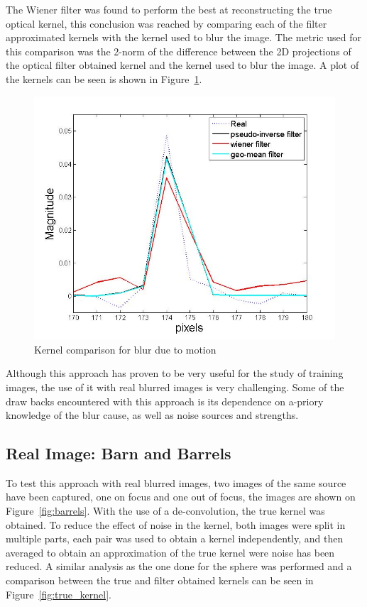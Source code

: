 The Wiener filter was found to perform the best at reconstructing the true optical kernel, this conclusion was reached by comparing each of the filter approximated kernels with the kernel used to blur the image. The metric used for this comparison was the 2-norm of the difference between the 2D projections of the optical filter obtained kernel and the kernel used to blur the image. A plot of the kernels can be seen is shown in Figure~\ref{fig:sph_kernels}.   

\begin{figure}[h!]
  \centering
                \centering
                \includegraphics[width=.5\textwidth]{kernel_motion.jpg}
                \caption{Kernel comparison for blur due to motion}
 \label{fig:sph_kernels}
\end{figure}

Although this approach has proven to be very useful for the study of training images, the use of it with real blurred images is very challenging. Some of the draw backs encountered with this approach is its dependence on a-priory knowledge of the blur cause, as well as noise sources and strengths. 

\subsection{Real Image: Barn and Barrels}

To test this approach with real blurred images, two images of the same source have been captured, one on focus and one out of focus, the images are shown on Figure~\ref{fig:barrels}. With the use of a de-convolution, the true kernel was obtained. To reduce the effect of noise in the kernel, both images were split in multiple parts, each pair was used to obtain a kernel independently, and then averaged to obtain an approximation of the true kernel were noise has been reduced. A similar analysis as the one done for the sphere was performed and a comparison between the true and filter obtained kernels can be seen in Figure~\ref{fig:true_kernel}.

